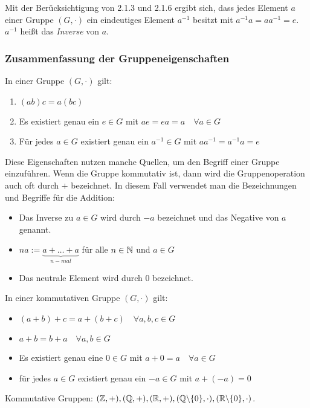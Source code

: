 \noindent Mit der Berücksichtigung von 2.1.3 und 2.1.6 ergibt sich, dass jedes Element $ a $ einer Gruppe $ (G,\cdot) $ ein eindeutiges Element $ a^{-1} $ besitzt mit $ a^{-1}a = aa^{-1} = e $. $ a^{-1} $ heißt das \emph{Inverse} von $ a $.

\subsubsection{Zusammenfassung der Gruppeneigenschaften}

In einer Gruppe $ (G, \cdot ) $ gilt:
\begin{enumerate}
	\item
		$ (ab)c = a(bc) $
	\item
		Es existiert genau ein $  e \in G $ mit $ ae = ea = a \quad \forall a \in G $
	\item
		Für jedes $ a \in G $ existiert genau ein $  a^{-1} \in G $ mit $ aa^{-1} = a^{-1}a = e $
\end{enumerate}
Diese Eigenschaften nutzen manche Quellen, um den Begriff einer Gruppe einzuführen. 
Wenn die Gruppe kommutativ ist, dann wird die Gruppenoperation auch oft durch $ + $ bezeichnet. In diesem Fall verwendet man die Bezeichnungen und Begriffe für die Addition:
\begin{itemize}
	\item Das Inverse zu $ a \in G $ wird durch $ -a $ bezeichnet und das Negative von $ a $ genannt.
	\item $ na := \underbrace{a+ \ldots + a}_{n-mal} $ für alle $ n \in \mathbb N $ und $ a \in G $
	\item Das neutrale Element wird durch $ 0 $ bezeichnet.
\end{itemize}
In einer kommutativen Gruppe $ (G, \cdot) $ gilt:
\begin{itemize}
	\item
		$ (a+b)+c = a+(b+c) \quad \forall a,b,c \in G $
	\item
		$ a+b = b+a \quad \forall a,b \in G $
	\item
		Es existiert genau eine $ 0 \in G $ mit $ a+0 = a \quad \forall a \in G $
	\item
		für jedes $ a \in G $ existiert genau ein $ -a \in G $ mit $ a+ (-a) = 0 $
\end{itemize}

\begin{bsp}
	Kommutative Gruppen: \hfill $ (\mathbb{Z}, +), \hfill (\mathbb{Q}, +), \hfill (\mathbb{R}, +), \hfill (\mathbb{Q} \backslash \{0\}, \cdot ), \hfill (\mathbb{R} \backslash \{0\}, \cdot ) $.
\end{bsp}

